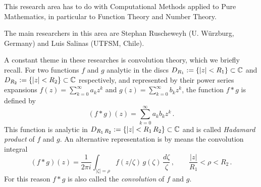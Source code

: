 \def\nullspace{\mathop{\rm Null}\nolimits}    %
\def\range{\mathop{\rm Range}\nolimits}       %
\def\rank{\mathop{\rm rank}\nolimits}         %
\def\rest#1{\mbox{\rm rest}\left\{#1\right\}} %
\def\rot{\mathop{\bf rot}\nolimits}           %
\def\seq#1#2{\ds\left\{ #1\right\}_{#2}}      %
\def\sign{\mathop{\rm sign}\nolimits}         %
\def\sup{\mathop{\rm sup}\limits}             %
\def\tg{\mathop{\rm tg}\nolimits}             %
\def\tr{\mathop{\bf trace}\nolimits}          %
\def\var{\mathcal{V}}                         %
\def\ZT#1{\ds\mathfrak{Z}\left[#1\right]}     %
\def\ZTinv#1{\ds\mathfrak{Z}^{-1}\left[#1\right]} %



\def\bfref#1{{\bf\ref{#1}}}                   %
\def\EW{valor propio}                         %
\def\EWS{valores propios}                     %
\def\EV{vector propio}                        %
\def\EVS{vectores propios}                    %







This research area has to do with Computational Methods applied to Pure
Mathematics, in particular to Function Theory and Number Theory.

The main researchers in this area are Stephan Ruscheweyh (U. W\"urzburg,
Germany) and Luis Salinas (UTFSM, Chile).

A constant theme in these researches is convolution theory, which we briefly
recall.
For two functions $f$ and $g$ analytic in the discs
$D_{R_1}:=\{|z|<R_1\}\subset{\mathbb C }$ and $D_{R_2}:=\{|z|<R_2\}\subset{\mathbb C }$
respectively, and represented by their power series expansions
$f(z)=\sum_{k=0}^\infty a_k z^k$ and $g(z)=\sum_{k=0}^\infty b_k z^k$,
the function $f*g$ is defined by
$$
(f*g)(z) = \sum_{k=0}^\infty a_k b_k z^k\,.
$$
This function is analytic in
$D_{R_1\,R_2}:=\{|z|<R_1\,R_2\}\subset{\mathbb C }$
and is called {\em Hadamard product} of $f$ and $g$.
An alternative representation is by means the convolution integral
$$
(f*g)(z) = \frac{1}{2\pi i}\int_{|\zeta|=\rho}
f(z/\zeta)\,g(\zeta)\,\frac{d\zeta}{\zeta}\,,\qquad
\frac{|z|}{R_1}<\rho<R_2\,.
$$
For this reason $f*g$ is also called the {\em convolution\/} of $f$ and $g$.


